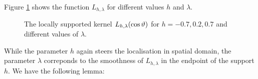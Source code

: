\documentclass[11pt,a4paper,twoside,bibtotoc]{scrartcl}
\theoremstyle{plain}
\theoremstyle{definition}
\theoremstyle{remark}
\newcommand{\vtheta}{\ensuremath{\vartheta}}
\newcommand{\fun}[2]{\ensuremath{#1{\hspace{-0.4ex}}\left(#2\right)}}
\numberwithin{equation}{section}
\numberwithin{table}{section}
\numberwithin{figure}{section}
\begin{document}
Figure \ref{Basics:Figure:LKernel} shows the function $L_{h,\lambda}$ for
different values $h$ and $\lambda$.
\begin{figure}[tb]
  \centering
  \hfill
  \caption{The locally supported kernel $\fun{L_{h,\lambda}}{\cos\vtheta}$ 
  for $h = -0.7, 0.2, 0.7$ and different values of $\lambda$.}
  \label{Basics:Figure:LKernel}
\end{figure}
While the parameter $h$ again steers the localisation in spatial domain, the
parameter $\lambda$ correponds to the smoothness of $L_{h,\lambda}$ in the
endpoint of the support $h$.
We have the following lemma:
\end{document}
